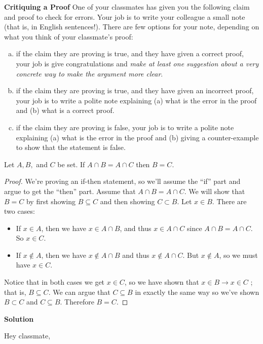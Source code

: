 \documentclass[11pt]{scrartcl}
\theoremstyle{dotlessP}
\theoremstyle{dotlessN}
\newcommand{\inter}{\cap}
\begin{document}
\begin{ques}
	\textbf{Critiquing a Proof} One of your classmates has given you the following claim and proof to check for errors. Your job is to write your colleague a small note (that is, in English sentences!). There are few options for your note, depending on what you think of your classmate's proof:
	\begin{enumerate}[(a)]
		\item if the claim they are proving is true, and they have given a correct proof, your job is give congratulations and \textit{make at least one suggestion about a very concrete way to make the argument more clear}.
		\item if the claim they are proving is true, and they have given an incorrect proof, your job is to write a polite note explaining (a) what is the error in the proof and (b) what is a correct proof.
		\item if the claim they are proving is false, your job is to write a polite note explaining (a) what is the error in the proof and (b) giving a counter-example to show that the statement is false.
	\end{enumerate}
	\begin{claim*}
		Let $A, B,$ and  $C$ be set. If $A \inter B = A \inter C$ then  $B = C$.
	\end{claim*}
	\begin{proof}
		We're proving an if-then statement, so we'll assume the ``if'' part and argue to get the ``then'' part. Assume that $A \inter B = A \inter C$. We will show that  $B=C$ by first showing $B \subseteq C$ and then showing $C \subset B$. Let $x \in B$. There are two cases:
		\begin{itemize}
			\item If $x \in A$, then we have $x \in A \inter B$, and thus $x \in A \inter C$ since $A \inter B = A \inter C$. So  $x \in C$.
			\item If $x \not\in A$, then we have  $x \not\in A \inter B$ and thus $x \not\in A \inter C$. But $x \not\in A$, so we must have $x \in C$.
		\end{itemize}
		Notice that in both cases we get $x \in C$, so we have shown that $x \in B \to x \in C$ ; that is, $B \subseteq C$. We can argue that  $C \subseteq B$ in exactly the same way so we've shown $B \subset C$ and $C \subseteq B$. Therefore $B = C$.
	\end{proof}
\end{ques}
\textbf{Solution}

Hey classmate,
\\
\end{document}
